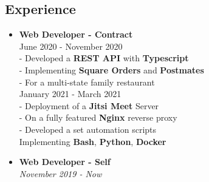 \documentclass[11pt,oneside,a4paper,titlepage]{article}
\begin{document}
\begin{tcolorbox}
\begin{minipage}[t]{10cm}
\begin{tcolorbox}[grow to right by=1cm,colframe=white,colback=white]
      \section*{Experience}
      \begin{itemize}[leftmargin=0.6cm, label={-}]
        \item{
            \textbf{Web Developer - Contract}\\
            {June 2020 - November 2020}\\
            {- Developed a \textbf{REST API} with \textbf{Typescript}}\\
            {- Implementing \textbf{Square Orders} and \textbf{Postmates}}\\
            {- For a multi-state family restaurant}
            \vspace{0.5cm}\\
            {January 2021 - March 2021}\\
            {- Deployment of a \textbf{Jitsi Meet} Server}\\
            {- On a fully featured \textbf{Nginx} reverse proxy}\\
            {- Developed a set automation scripts}\\
            {\hspace*{9pt}Implementing \textbf{Bash}, \textbf{Python}, \textbf{Docker}}

        }
        \item{
            \textbf{Web Developer - Self}\\
            \emph{November 2019 - Now}
          }
      \end{itemize}
    \end{tcolorbox}
  \end{minipage}
\end{tcolorbox}
\end{document}
